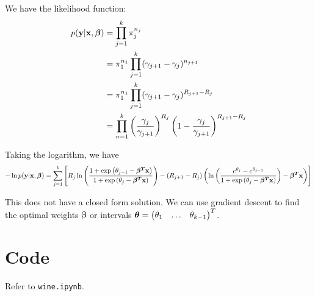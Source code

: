 \documentclass[reqno]{amsart}
\begin{document}
    We have the likelihood function:
    \begin{align}
        \begin{split}
            p(\mathbf{y}|\mathbf{x}, \boldsymbol{\beta}) &= \prod_{j = 1}^{k} \pi_j^{n_j} \\
            &= \pi_1^{n_1} \prod_{j = 1}^{k} (\gamma_{j + 1} - \gamma_j)^{n_{j + 1}} \\
            &= \pi_1^{n_1} \prod_{j = 1}^{k} (\gamma_{j + 1} - \gamma_j)^{R_{j + 1} - R_j}  \\
            &= \prod_{n = 1}^{k} \left(\frac{\gamma_j}{\gamma_{j + 1}}\right)^{R_j} \left(1 - \frac{\gamma_j}{\gamma_{j + 1}}\right)^{R_{j + 1} - R_j} \\
        \end{split}
    \end{align}

    Taking the logarithm, we have
    \begin{equation}
        -\ln p(\mathbf{y}|\mathbf{x}, \boldsymbol{\beta}) = 
        \sum_{j = 1}^{k} \left[R_j \ln \left(\frac{1 + \exp \left(\theta_{j - 1} - \boldsymbol{\beta^T}\mathbf{x}\right)}{1 + \exp \left(\theta_j - \boldsymbol{\beta^T}\mathbf{x}\right)}\right) 
        - (R_{j + 1} - R_j) \left(\ln \left(\frac{e^{\theta_j} - e^{\theta_{j - 1}}}{1 + \exp \left(\theta_j - \boldsymbol{\beta^T}\mathbf{x}\right)}\right) - \boldsymbol{\beta^T}\mathbf{x}\right)\right]
    \end{equation}

    This does not have a closed form solution. We can use gradient descent to find the optimal weights \(\boldsymbol{\beta}\) or intervals \(\boldsymbol{\theta} = \begin{pmatrix}\theta_1 & \ldots & \theta_{k - 1}\end{pmatrix}^T\).

    \section{Code}

    Refer to \texttt{wine.ipynb}.
\end{document}
